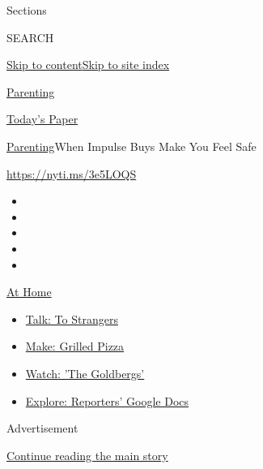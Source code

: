 Sections

SEARCH

\protect\hyperlink{site-content}{Skip to
content}\protect\hyperlink{site-index}{Skip to site index}

\href{https://www.nytimes.com/section/parenting}{Parenting}

\href{https://myaccount.nytimes.com/auth/login?response_type=cookie\&client_id=vi}{}

\href{https://www.nytimes.com/section/todayspaper}{Today's Paper}

\href{/section/parenting}{Parenting}\textbar{}When Impulse Buys Make You
Feel Safe

\url{https://nyti.ms/3e5LOQS}

\begin{itemize}
\item
\item
\item
\item
\item
\end{itemize}

\href{https://www.nytimes.com/spotlight/at-home?action=click\&pgtype=Article\&state=default\&region=TOP_BANNER\&context=at_home_menu}{At
Home}

\begin{itemize}
\tightlist
\item
  \href{https://www.nytimes.com/2020/08/03/well/family/the-benefits-of-talking-to-strangers.html?action=click\&pgtype=Article\&state=default\&region=TOP_BANNER\&context=at_home_menu}{Talk:
  To Strangers}
\item
  \href{https://www.nytimes.com/2020/08/01/at-home/coronavirus-make-pizza-on-a-grill.html?action=click\&pgtype=Article\&state=default\&region=TOP_BANNER\&context=at_home_menu}{Make:
  Grilled Pizza}
\item
  \href{https://www.nytimes.com/2020/07/31/arts/television/goldbergs-abc-stream.html?action=click\&pgtype=Article\&state=default\&region=TOP_BANNER\&context=at_home_menu}{Watch:
  'The Goldbergs'}
\item
  \href{https://www.nytimes.com/interactive/2020/at-home/even-more-reporters-editors-diaries-lists-recommendations.html?action=click\&pgtype=Article\&state=default\&region=TOP_BANNER\&context=at_home_menu}{Explore:
  Reporters' Google Docs}
\end{itemize}

Advertisement

\protect\hyperlink{after-top}{Continue reading the main story}

